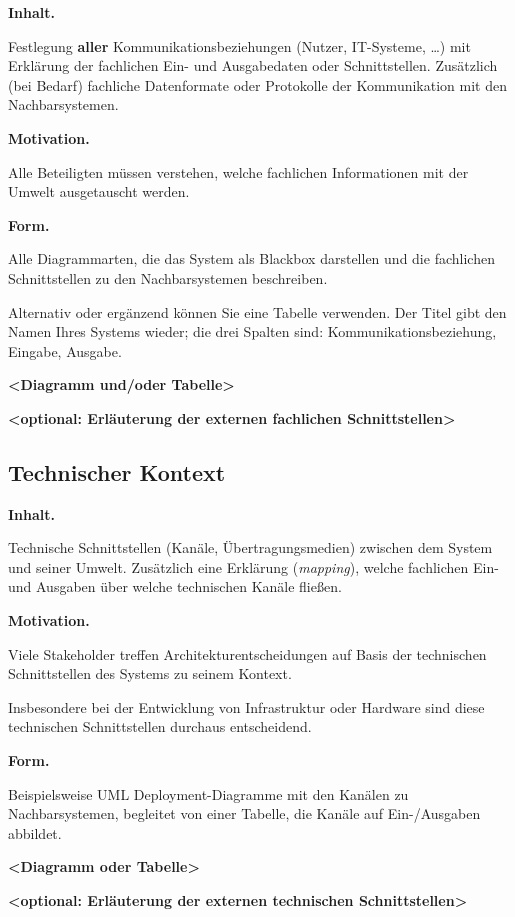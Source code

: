 \documentclass[]{article}
\begin{document}
\textbf{Inhalt.}

Festlegung \textbf{aller} Kommunikationsbeziehungen (Nutzer, IT-Systeme,
\ldots{}) mit Erklärung der fachlichen Ein- und Ausgabedaten oder
Schnittstellen. Zusätzlich (bei Bedarf) fachliche Datenformate oder
Protokolle der Kommunikation mit den Nachbarsystemen.

\textbf{Motivation.}

Alle Beteiligten müssen verstehen, welche fachlichen Informationen mit
der Umwelt ausgetauscht werden.

\textbf{Form.}

Alle Diagrammarten, die das System als Blackbox darstellen und die
fachlichen Schnittstellen zu den Nachbarsystemen beschreiben.

Alternativ oder ergänzend können Sie eine Tabelle verwenden. Der Titel
gibt den Namen Ihres Systems wieder; die drei Spalten sind:
Kommunikationsbeziehung, Eingabe, Ausgabe.

\textbf{\textless{}Diagramm und/oder Tabelle\textgreater{}}

\textbf{\textless{}optional: Erläuterung der externen fachlichen
Schnittstellen\textgreater{}}

\hypertarget{_technischer_kontext}{%
\subsection{Technischer Kontext}\label{_technischer_kontext}}

\textbf{Inhalt.}

Technische Schnittstellen (Kanäle, Übertragungsmedien) zwischen dem
System und seiner Umwelt. Zusätzlich eine Erklärung (\emph{mapping}),
welche fachlichen Ein- und Ausgaben über welche technischen Kanäle
fließen.

\textbf{Motivation.}

Viele Stakeholder treffen Architekturentscheidungen auf Basis der
technischen Schnittstellen des Systems zu seinem Kontext.

Insbesondere bei der Entwicklung von Infrastruktur oder Hardware sind
diese technischen Schnittstellen durchaus entscheidend.

\textbf{Form.}

Beispielsweise UML Deployment-Diagramme mit den Kanälen zu
Nachbarsystemen, begleitet von einer Tabelle, die Kanäle auf
Ein-/Ausgaben abbildet.

\textbf{\textless{}Diagramm oder Tabelle\textgreater{}}

\textbf{\textless{}optional: Erläuterung der externen technischen
Schnittstellen\textgreater{}}
\end{document}
